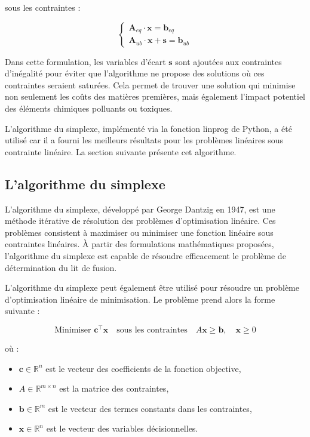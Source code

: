 \documentclass[12pt]{article}
\begin{document}
sous les contraintes :

$$
\begin{cases}
\mathbf{A}_{eq} \cdot \mathbf{x} = \mathbf{b}_{eq} \\
\mathbf{A}_{ub}  \cdot \mathbf{x} + \mathbf{s}  = \mathbf{b}_{ub} 
\end{cases}
$$

Dans cette formulation, les variables d'écart $\mathbf{s} $ sont ajoutées aux contraintes
d'inégalité pour éviter que l'algorithme ne propose des solutions où 
ces contraintes seraient saturées. Cela permet de trouver une solution 
qui minimise non seulement les coûts des matières premières, mais 
également l'impact potentiel des éléments chimiques polluants ou toxiques.






L'algorithme du simplexe, implémenté via la fonction linprog de Python, 
a été utilisé car il a fourni les meilleurs résultats pour les problèmes 
linéaires sous contrainte linéaire. La section suivante présente cet 
algorithme.


\subsection{ L'algorithme du simplexe }


L'algorithme du simplexe, développé par George Dantzig en 1947, est une 
méthode itérative de résolution des problèmes d'optimisation linéaire. 
Ces problèmes consistent à maximiser ou minimiser une fonction linéaire 
sous contraintes linéaires. À partir des formulations mathématiques 
proposées, l'algorithme du simplexe est capable de résoudre efficacement 
le problème de détermination du lit de fusion.





L'algorithme du simplexe peut également être utilisé pour résoudre un 
problème d'optimisation linéaire de minimisation. Le problème prend alors 
la forme suivante :

\[
\text{Minimiser } \mathbf{c}^\top \mathbf{x} \quad \text{sous les contraintes} \quad A\mathbf{x} \geq \mathbf{b}, \quad \mathbf{x} \geq 0
\]

où :
\begin{itemize}
    \item \(\mathbf{c} \in \mathbb{R}^n\) est le vecteur des 
    coefficients de la fonction objective,
    \item \(A \in \mathbb{R}^{m \times n}\) est la matrice des contraintes,
    \item \(\mathbf{b} \in \mathbb{R}^m\) est le vecteur des termes 
    constants dans les contraintes,
    \item \(\mathbf{x} \in \mathbb{R}^n\) est le vecteur des variables 
    décisionnelles.
\end{itemize}
\end{document}
